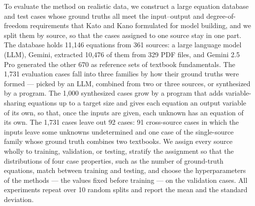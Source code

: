To evaluate the method on realistic data, we construct a large equation database and test cases
whose ground truths all meet the input--output and degree-of-freedom requirements that Kato and
Kano formulated for model building\cite{CombineEq}, and we split them by source, so that the cases
assigned to one source stay in one part.
The database holds 11,146 equations from 361 sources: a large language model (LLM), Gemini,
extracted 10,476 of them from 329 PDF files, and Gemini 2.5 Pro generated the other 670 as
reference sets of textbook fundamentals. The 1,731 evaluation cases fall into three families by how
their ground truths were formed --- picked by an LLM, combined from two or three sources, or
synthesized by a program. The 1,000 synthesized cases grow by a program that adds
variable-sharing equations up to a target size and gives each equation an output variable of its
own, so that, once the inputs are given, each unknown has an equation of its own. The 1,731 cases
leave out 92 cases: 91 cross-source cases in which the inputs leave some unknowns undetermined and
one case of the single-source family whose ground truth combines two textbooks. We assign every source wholly to
training, validation, or testing, stratify the assignment so that the distributions of four case
properties, such as the number of ground-truth equations, match between training and testing, and
choose the hyperparameters of the methods --- the values fixed before training --- on the validation
cases. All experiments repeat over 10 random
splits and report the mean and the standard deviation.

